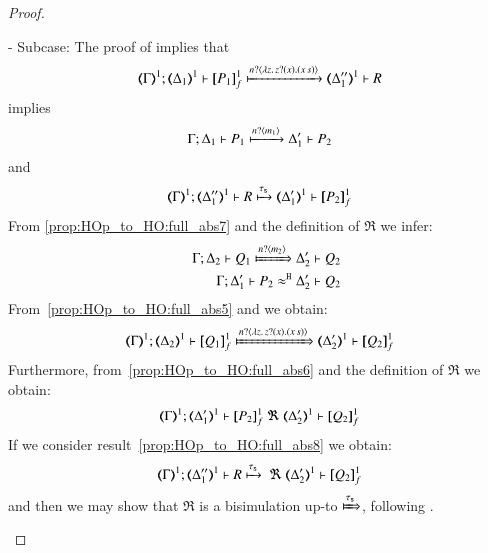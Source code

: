 \begin{proof}
\begin{enumerate}[1.]
	\noi - Subcase:
	\noi The proof of  implies that
%
	\[
		\horel{\mapt{\Gamma}^{1}}{\mapt{\Delta_1}^{1}}{\pmapp{P_1}{1}{f}}{\hby{\bactinp{n}{\abs{z}{ \binp{z}{x} (\appl{x}{s})}}}}{\mapt{\Delta_1''}^{1}} R %
	\]
%
	\noi implies
%
	\begin{eqnarray}
		\Gamma; \Delta_1 \vdash P_1 \xmapsto{n ?\langle m_1 \rangle} \Delta_1' \vdash P_2
		\label{prop:HOp_to_HO:full_abs7}
	\end{eqnarray}
%
	\noi and
%
	\begin{eqnarray}
		\horel{\mapt{\Gamma}^{1}}{\mapt{\Delta_1''}^{1}}{R}{\hby{\stau}}{\mapt{\Delta_1'}^{1}}{\pmapp{P_2}{1}{f}}
		\label{prop:HOp_to_HO:full_abs8}
	\end{eqnarray}
%
%
	\noi From \eqref{prop:HOp_to_HO:full_abs7} and the definition of $\Re$ we infer:
%
	\begin{eqnarray}
		&&\horel{\Gamma}{\Delta_2}{Q_1}{\Hby{\bactinp{n}{m_2}}}{\Delta_2'}{Q_2}
		\label{prop:HOp_to_HO:full_abs5}
		\\
		&&\horel{\Gamma}{\Delta_1'}{P_2}{\hwb}{\Delta_2'}{Q_2}
		\label{prop:HOp_to_HO:full_abs6}
	\end{eqnarray}
%
	\noi From~\eqref{prop:HOp_to_HO:full_abs5} and  we obtain:
%
	\[
		\horel{\mapt{\Gamma}^{1}}{\mapt{\Delta_2}^{1}}{\pmapp{Q_1}{1}{f}}{\Hby{\bactinp{n}{\abs{z}{\binp{z}{x} (\appl{x}{s})}}}}{\mapt{\Delta_2'}^{1}}{\pmapp{Q_2}{1}{f}}
	\]
%
	\noi Furthermore, from~\ref{prop:HOp_to_HO:full_abs6} and the definition of $\Re$ we obtain:
%
	\[
		\horel{\mapt{\Gamma}^{1}}{\mapt{\Delta_1'}^{1}}{\pmapp{P_2}{1}{f}}{\ \Re\ }{\mapt{\Delta_2'}^{1}}{\pmapp{Q_2}{1}{f}}
	\]
%
	\noi If we consider result~\eqref{prop:HOp_to_HO:full_abs8} we obtain:
%
	\[
		\horel{\mapt{\Gamma}^{1}}{\mapt{\Delta_1''}^{1}}{R}{\hby{\stau}\ \Re\ }{\mapt{\Delta_2'}^{1}}{\pmapp{Q_2}{1}{f}}
	\]
	and then we may show that $\Re$ is a bisimulation up-to $\Hby{\stau}$,
	following . 
\end{enumerate}
\end{proof}




